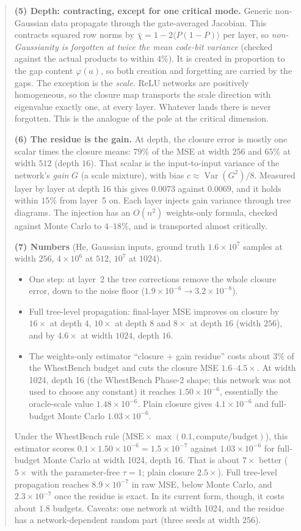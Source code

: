 \documentclass[11pt]{article}
\theoremstyle{definition}
\theoremstyle{remark}
\begin{document}
\begin{abstract}
\textbf{(5) Depth: contracting, except for one critical mode.} Generic non-Gaussian data propagate through the gate-averaged Jacobian. This contracts squared row norms by $\bar\chi=1-2\langle P(1-P)\rangle$ per layer, so \emph{non-Gaussianity is forgotten at twice the mean code-bit variance} (checked against the actual products to within $4\%$). It is created in proportion to the gap content $\varphi(a)$, so both creation and forgetting are carried by the gaps. The exception is the \emph{scale}. ReLU networks are positively homogeneous, so the closure map transports the scale direction with eigenvalue exactly one, at every layer. Whatever lands there is never forgotten. This is the analogue of the pole at the critical dimension.

\textbf{(6) The residue is the gain.} At depth, the closure error is mostly one scalar times the closure means: $79\%$ of the MSE at width $256$ and $65\%$ at width $512$ (depth $16$). That scalar is the input-to-input variance of the network's \emph{gain} $G$ (a scale mixture), with bias $c\approx\operatorname{Var}(G^2)/8$. Measured layer by layer at depth 16 this gives $0.0073$ against $0.0069$, and it holds within $15\%$ from layer~5 on. Each layer injects gain variance through tree diagrams. The injection has an $O(n^2)$ weights-only formula, checked against Monte Carlo to $4$--$18\%$, and is transported almost critically.

\textbf{(7) Numbers} (He, Gaussian inputs, ground truth $1.6\times10^7$ samples at width $256$, $4\times10^6$ at $512$, $10^7$ at $1024$).
\begin{itemize}
\item One step: at layer~2 the tree corrections remove the whole closure error, down to the noise floor ($1.9\times10^{-6}\to3.2\times10^{-8}$).
\item Full tree-level propagation: final-layer MSE improves on closure by $16\times$ at depth $4$, $10\times$ at depth $8$ and $8\times$ at depth $16$ (width $256$), and by $4.6\times$ at width $1024$, depth $16$.
\item The weights-only estimator ``closure $+$ gain residue'' costs about $3\%$ of the WhestBench budget and cuts the closure MSE $1.6$--$4.5\times$. At width 1024, depth 16 (the WhestBench Phase-2 shape; this network was not used to choose any constant) it reaches $1.50\times10^{-6}$, essentially the oracle-scale value $1.48\times10^{-6}$. Plain closure gives $4.1\times10^{-6}$ and full-budget Monte Carlo $1.03\times10^{-6}$.
\end{itemize}
Under the WhestBench rule ($\text{MSE}\times\max(0.1,\text{compute}/\text{budget})$), this estimator scores $0.1\times1.50\times10^{-6}=1.5\times10^{-7}$ against $1.03\times10^{-6}$ for full-budget Monte Carlo at width 1024, depth 16. That is about $7\times$ better ($5\times$ with the parameter-free $\tau=1$; plain closure $2.5\times$). Full tree-level propagation reaches $8.9\times10^{-7}$ in raw MSE, below Monte Carlo, and $2.3\times10^{-7}$ once the residue is exact. In its current form, though, it costs about $1.8$ budgets. Caveats: one network at width 1024, and the residue has a network-dependent random part (three seeds at width 256).
\end{abstract}
\end{document}
